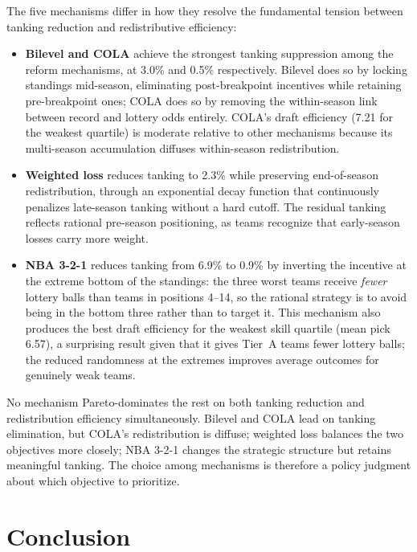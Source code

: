 \documentclass{article}
\begin{document}
The five mechanisms differ in how they resolve the fundamental tension between
tanking reduction and redistributive efficiency:
\begin{itemize}
    \item \textbf{Bilevel and COLA} achieve the strongest tanking suppression
    among the reform mechanisms, at 3.0\% and 0.5\% respectively.
    Bilevel does so by locking standings mid-season, eliminating post-breakpoint
    incentives while retaining pre-breakpoint ones; COLA does so by removing
    the within-season link between record and lottery odds entirely.
    COLA's draft efficiency (7.21 for the weakest quartile) is moderate
    relative to other mechanisms because its multi-season accumulation
    diffuses within-season redistribution.
    \item \textbf{Weighted loss} reduces tanking to 2.3\% while preserving
    end-of-season redistribution, through an exponential decay function that
    continuously penalizes late-season tanking without a hard cutoff.
    The residual tanking reflects rational pre-season positioning, as teams
    recognize that early-season losses carry more weight.
    \item \textbf{NBA 3-2-1} reduces tanking from 6.9\% to 0.9\% by inverting
    the incentive at the extreme bottom of the standings: the three worst teams
    receive \emph{fewer} lottery balls than teams in positions 4--14, so the
    rational strategy is to avoid being in the bottom three rather than to
    target it.
    This mechanism also produces the best draft efficiency for the weakest
    skill quartile (mean pick 6.57), a surprising result given that it gives
    Tier~A teams fewer lottery balls; the reduced randomness at the extremes
    improves average outcomes for genuinely weak teams.
\end{itemize}

No mechanism Pareto-dominates the rest on both tanking reduction and
redistribution efficiency simultaneously.
Bilevel and COLA lead on tanking elimination, but COLA's redistribution is
diffuse; weighted loss balances the two objectives more closely; NBA 3-2-1
changes the strategic structure but retains meaningful tanking.
The choice among mechanisms is therefore a policy judgment about which
objective to prioritize.


\section{Conclusion}
\end{document}

